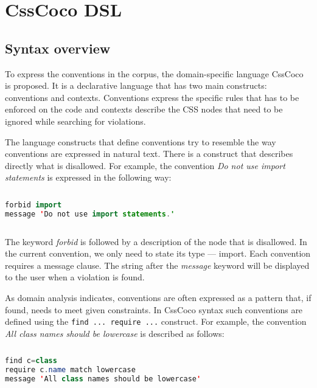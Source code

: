 \section{CssCoco DSL}

\subsection{Syntax overview}

To express the conventions in the corpus, the domain-specific language CssCoco
is proposed. It is a declarative language that has two main constructs:
conventions and contexts. Conventions express the specific rules that has to
be enforced on the code and contexts describe the CSS nodes that need to be
ignored while searching for violations.

The language constructs that define conventions try to resemble the way
conventions are expressed in natural text. There is a construct that describes
directly what is disallowed. For example, the convention \textit{Do not use
import statements} is expressed in the following way:

\begin{sourcecode}
\begin{lstlisting}[style=mono,language=Java]
forbid import
message 'Do not use import statements.'
\end{lstlisting}
\end{sourcecode}

The keyword \textit{forbid} is followed by a description of the node that is
disallowed. In the current convention, we only need to state its type ---
import. Each convention requires a message clause. The string after the
\textit{message} keyword will be displayed to the user when a violation is
found.

As domain analysis indicates, conventions are often expressed as a pattern that, if found, needs to
meet given constraints. In CssCoco syntax such conventions are defined using the \texttt{find ...
require ...} construct. For example, the convention \textit{All class names should be lowercase} is
described as follows:

\begin{sourcecode}
\begin{lstlisting}[style=mono,language=Java]
find c=class
require c.name match lowercase
message 'All class names should be lowercase'
\end{lstlisting}
\end{sourcecode}

